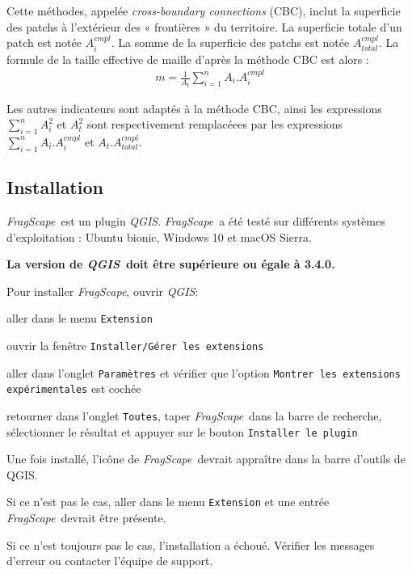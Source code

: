 \documentclass[11pt]{article}
\newcommand{\tool}{\emph{FragScape}}
\newcommand{\qgis}{\emph{QGIS}}
\let\tempone\itemize
\let\temptwo\enditemize
\renewenvironment{enumerate}{\tempone\addtolength{\itemsep}{-0.5\baselineskip}}{\temptwo}
\begin{document}
Cette méthodes, appelée \textit{cross-boundary connections} (CBC), inclut la superficie des patchs à l'extérieur des « frontières » du territoire. La superficie totale d'un patch est notée $A_{i}^{cmpl}$. La somme de la superficie des patchs est notée $A_{total}^{cmpl}$. La formule de la taille effective de maille d'après la méthode CBC est alors :
\begin{align*}
m = \frac{1}{A_{t}}\sum_{i=1}^{n}A_{i}.A_{i}^{cmpl}
\end{align*}

Les autres indicateurs sont adaptés à la méthode CBC, ainsi les expressions $\sum_{i=1}^{n}A_{i}^{2}$ et $A_{t}^{2}$ sont respectivement remplacéees par les expressions $\sum_{i=1}^{n}A_{i}.A_{i}^{cmpl}$ et $A_{t}.A_{total}^{cmpl}$.

\subsection{Installation}

\tool\ est un plugin \qgis. \tool\ a été testé sur différents systèmes d'exploitation : Ubuntu bionic, Windows 10 et macOS Sierra.

\textbf{\color{red}La version de \qgis\ doit être supérieure ou égale à 3.4.0.}
\frameboxend

Pour installer \tool, ouvrir \qgis:
\begin{enumerate}
    \item aller dans le menu \texttt{Extension}
    \item ouvrir la fenêtre \texttt{Installer/Gérer les extensions}
    \item aller dans l'onglet \texttt{Paramètres} et vérifier que l'option \texttt{Montrer les extensions expérimentales} est cochée
    \item retourner dans l'onglet \texttt{Toutes}, taper \tool\ dans la barre de recherche, sélectionner le résultat et appuyer sur le bouton \texttt{Installer le plugin}
\end{enumerate}

Une fois installé, l'icône  de \tool\ devrait appraître dans la barre d'outils de QGIS.

Si ce n'est pas le cas, aller dans le menu \texttt{Extension} et une entrée \tool\ devrait être présente.

Si ce n'est toujours pas le cas, l'installation a échoué. Vérifier les messages d'erreur ou contacter l'équipe de support.
\end{document}

